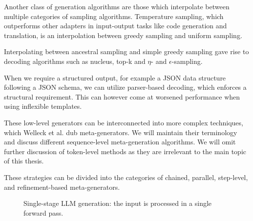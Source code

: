 Another class of generation algorithms are those which interpolate between multiple categories of sampling algorithms.
Temperature sampling, which outperforms other adapters in input-output tasks like code generation and translation,
is an interpolation between greedy sampling and uniform sampling. 

Interpolating between ancestral sampling and simple greedy sampling gave rise to decoding algorithms such as
nucleus, top-k and $\eta$- and $\epsilon$-sampling\cite{welleck2024decodingmetagenerationinferencetimealgorithms}. 

When we require a structured output, for example a JSON data 
structure following a JSON schema, we can utilize parser-based decoding, which enforces a structural requirement.
This can however come at worsened performance when using inflexible templates\cite{tam2024letspeakfreelystudy}.

These low-level generators can be interconnected into more complex techniques, which Welleck et al. dub meta-generators\cite{welleck2024decodingmetagenerationinferencetimealgorithms}.
We will maintain their terminology and discuss different sequence-level meta-generation algorithms. We will omit further discussion of token-level methods as
they are irrelevant to the main topic of this thesis. 

These strategies can be divided into the categories of chained, parallel, step-level, and refinement-based meta-generators.
\begin{figure}[ht]
    \centering
    \caption{Single-stage LLM generation: the input is processed in a single forward pass.}
    \label{fig:single_stage}
\end{figure}

